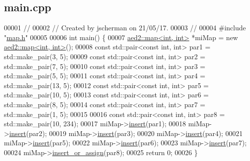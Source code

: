\hypertarget{main_8cpp_source}{}\subsection{main.\+cpp}

\begin{DoxyCode}
00001 \textcolor{comment}{//}
00002 \textcolor{comment}{// Created by jscherman on 21/05/17.}
00003 \textcolor{comment}{//}
00004 \textcolor{preprocessor}{#include "\hyperlink{map_8h}{map.h}"}
00005 
00006 \textcolor{keywordtype}{int} main() \{
00007     \hyperlink{classaed2_1_1map}{aed2::map<int, int>} *miMap = \textcolor{keyword}{new} \hyperlink{classaed2_1_1map}{aed2::map<int, int>}();
00008     \textcolor{keyword}{const} std::pair<const int, int> par1 = std::make\_pair(3, 5);
00009     \textcolor{keyword}{const} std::pair<const int, int> par2 = std::make\_pair(7, 5);
00010     \textcolor{keyword}{const} std::pair<const int, int> par3 = std::make\_pair(5, 5);
00011     \textcolor{keyword}{const} std::pair<const int, int> par4 = std::make\_pair(13, 5);
00012     \textcolor{keyword}{const} std::pair<const int, int> par5 = std::make\_pair(10, 5);
00013     \textcolor{keyword}{const} std::pair<const int, int> par6 = std::make\_pair(8, 5);
00014     \textcolor{keyword}{const} std::pair<const int, int> par7 = std::make\_pair(1, 5);
00015 
00016     \textcolor{keyword}{const} std::pair<const int, int> par8 = std::make\_pair(10, 234);
00017     miMap->\hyperlink{classaed2_1_1map_a6941cde9a79c27f054b5c97a587a1854_a6941cde9a79c27f054b5c97a587a1854}{insert}(par1);
00018     miMap->\hyperlink{classaed2_1_1map_a6941cde9a79c27f054b5c97a587a1854_a6941cde9a79c27f054b5c97a587a1854}{insert}(par2);
00019     miMap->\hyperlink{classaed2_1_1map_a6941cde9a79c27f054b5c97a587a1854_a6941cde9a79c27f054b5c97a587a1854}{insert}(par3);
00020     miMap->\hyperlink{classaed2_1_1map_a6941cde9a79c27f054b5c97a587a1854_a6941cde9a79c27f054b5c97a587a1854}{insert}(par4);
00021     miMap->\hyperlink{classaed2_1_1map_a6941cde9a79c27f054b5c97a587a1854_a6941cde9a79c27f054b5c97a587a1854}{insert}(par5);
00022     miMap->\hyperlink{classaed2_1_1map_a6941cde9a79c27f054b5c97a587a1854_a6941cde9a79c27f054b5c97a587a1854}{insert}(par6);
00023     miMap->\hyperlink{classaed2_1_1map_a6941cde9a79c27f054b5c97a587a1854_a6941cde9a79c27f054b5c97a587a1854}{insert}(par7);
00024     miMap->\hyperlink{classaed2_1_1map_a2ef6723c183916276b0afc4a4c721475_a2ef6723c183916276b0afc4a4c721475}{insert\_or\_assign}(par8);
00025     \textcolor{keywordflow}{return} 0;
00026 \}
\end{DoxyCode}
